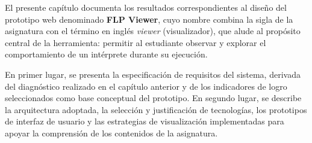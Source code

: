 El presente capítulo documenta los resultados correspondientes al diseño del prototipo web denominado \textbf{FLP Viewer}, cuyo nombre combina la sigla de la asignatura con el término en inglés \textit{viewer} (visualizador), que alude al propósito central de la herramienta: permitir al estudiante observar y explorar el comportamiento de un intérprete durante su ejecución.

En primer lugar, se presenta la especificación de requisitos del sistema, derivada del diagnóstico realizado en el capítulo anterior y de los indicadores de logro seleccionados como base conceptual del prototipo. En segundo lugar, se describe la arquitectura adoptada, la selección y justificación de tecnologías, los prototipos de interfaz de usuario y las estrategias de visualización implementadas para apoyar la comprensión de los contenidos de la asignatura.




